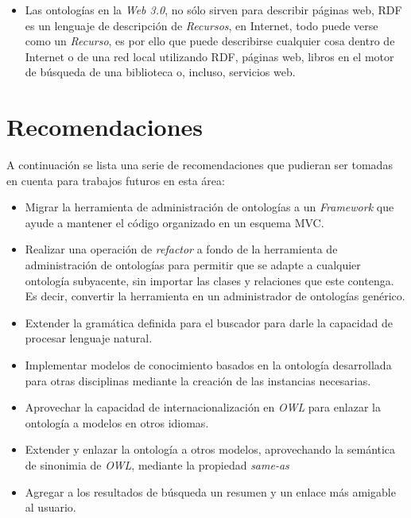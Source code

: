 \begin{itemize}
    \item Las ontologías en la \textit{Web 3.0}, no sólo sirven para describir páginas web, RDF es un lenguaje de descripción de \textit{Recursos}, en Internet, todo puede verse como un \textit{Recurso}, es por ello que puede describirse cualquier cosa dentro de Internet o de una red local utilizando RDF, páginas web, libros en el motor de búsqueda de una biblioteca o, incluso, servicios web.
\end{itemize}

\section{Recomendaciones}
A continuación se lista una serie de recomendaciones que pudieran ser tomadas en cuenta para trabajos futuros en esta área:

\begin{itemize}
    \item Migrar la herramienta de administración de ontologías a un \textit{Framework} que ayude a mantener el código organizado en un esquema MVC.
    \item Realizar una operación de \textit{refactor} a fondo de la herramienta de administración de ontologías para permitir que se adapte a cualquier ontología subyacente, sin importar las clases y relaciones que este contenga. Es decir, convertir la herramienta en un administrador de ontologías genérico.
    \item Extender la gramática definida para el buscador para darle la capacidad de procesar lenguaje natural.
    \item Implementar modelos de conocimiento basados en la ontología desarrollada para otras disciplinas mediante la creación de las instancias necesarias.
    \item Aprovechar la capacidad de internacionalización en \textit{OWL} para enlazar la ontología a modelos en otros idiomas.
    \item Extender y enlazar la ontología a otros modelos, aprovechando la semántica de sinonimia de \textit{OWL}, mediante la propiedad \textit{same-as}
    \item Agregar a los resultados de búsqueda un resumen y un enlace más amigable al usuario.
\end{itemize}
